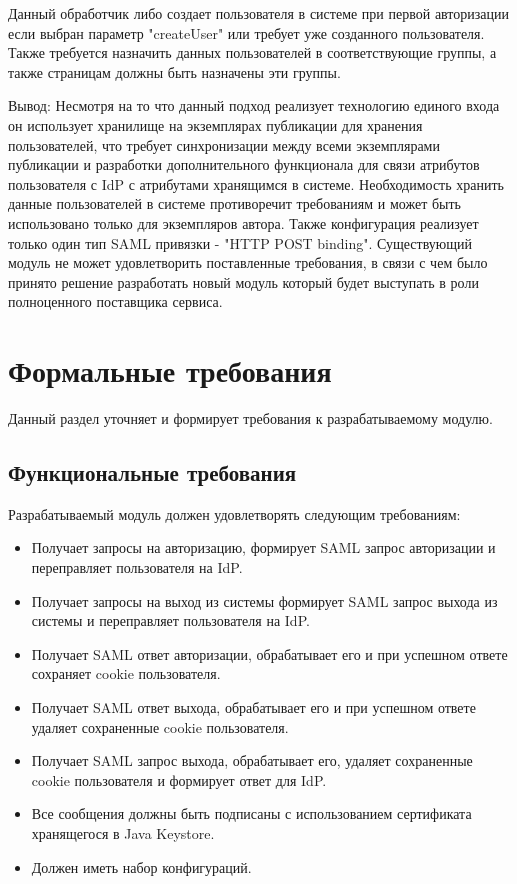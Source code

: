 Данный обработчик либо создает пользователя в системе при первой авторизации если выбран параметр "createUser" или требует уже созданного пользователя. Также требуется назначить данных пользователей в соответствующие группы, а также страницам должны быть назначены эти группы. 

Вывод: Несмотря на то что данный подход реализует технологию единого входа он использует хранилище на экземплярах публикации для хранения пользователей, что требует синхронизации между всеми экземплярами публикации и разработки дополнительного функционала для связи атрибутов пользователя с IdP с атрибутами  хранящимся в системе. Необходимость хранить данные пользователей в системе противоречит требованиям и может быть использовано только для экземпляров автора. Также конфигурация реализует только один тип SAML привязки - "HTTP POST binding". Существующий модуль не может удовлетворить поставленные требования, в связи с чем было принято решение разработать новый модуль который будет выступать в роли полноценного поставщика сервиса.

\section{Формальные требования}
Данный раздел уточняет и формирует требования к разрабатываемому модулю.

\subsection{Функциональные требования}
Разрабатываемый модуль должен удовлетворять следующим требованиям:
\begin{itemize}
\item Получает запросы на авторизацию, формирует SAML запрос авторизации и  переправляет пользователя на IdP.
\item Получает запросы на выход из системы формирует SAML запрос выхода из системы и переправляет пользователя на IdP.
\item Получает SAML ответ авторизации, обрабатывает его и при успешном ответе сохраняет cookie пользователя.
\item Получает SAML ответ выхода, обрабатывает его и при успешном ответе удаляет сохраненные cookie пользователя.
\item Получает SAML запрос выхода, обрабатывает его, удаляет сохраненные cookie пользователя и формирует ответ для IdP.
\item Все сообщения должны быть подписаны с использованием сертификата хранящегося в Java Keystore.
\item Должен иметь набор конфигураций.
\end{itemize}

